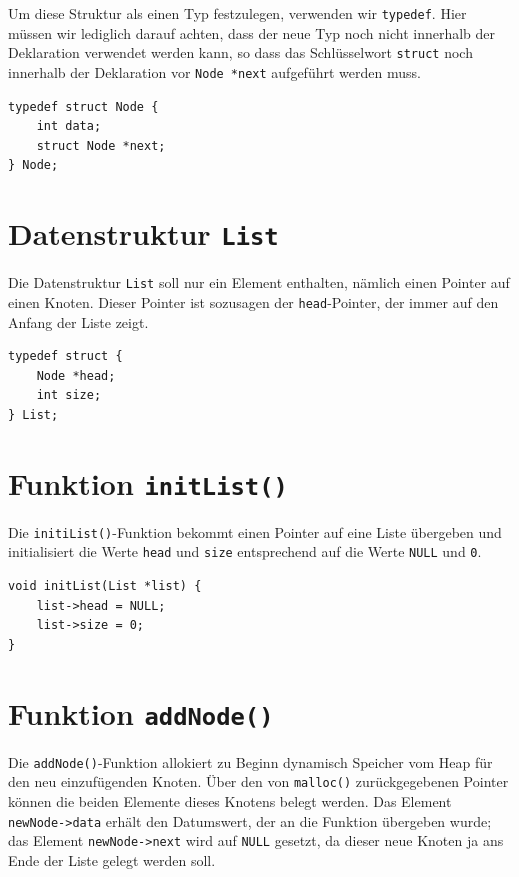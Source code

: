 Um diese Struktur als einen Typ festzulegen, verwenden wir
\texttt{typedef}. Hier müssen wir lediglich darauf achten, dass der neue
Typ noch nicht innerhalb der Deklaration verwendet werden kann, so dass das
Schlüsselwort \texttt{struct} noch innerhalb der Deklaration vor
\texttt{Node *next} aufgeführt werden muss.

\begin{verbatim}
typedef struct Node {
    int data;
    struct Node *next;
} Node;
\end{verbatim}

\section*{Datenstruktur \texttt{List}}

Die Datenstruktur \texttt{List} soll nur ein Element enthalten, nämlich
einen Pointer auf einen Knoten. Dieser Pointer ist sozusagen der
\texttt{head}-Pointer, der immer auf den Anfang der Liste zeigt.

\begin{verbatim}
typedef struct {
    Node *head;
    int size;
} List;
\end{verbatim}

\section*{Funktion \texttt{initList()}}

Die \texttt{initiList()}-Funktion bekommt einen Pointer auf eine Liste
übergeben und initialisiert die Werte \texttt{head} und
\texttt{size} entsprechend auf die Werte \texttt{NULL} und
\texttt{0}.

\begin{verbatim}
void initList(List *list) {
    list->head = NULL;
    list->size = 0;
}
\end{verbatim}

\section*{Funktion \texttt{addNode()}}

Die \texttt{addNode()}-Funktion allokiert zu Beginn dynamisch Speicher
vom Heap für den neu einzufügenden Knoten. Über den von \texttt{malloc()}
zurückgegebenen Pointer können die beiden Elemente dieses Knotens belegt werden.
Das Element \texttt{newNode->data} erhält den Datumswert, der an die
Funktion übergeben wurde; das Element \texttt{newNode->next} wird auf
\texttt{NULL} gesetzt, da dieser neue Knoten ja ans Ende der Liste gelegt
werden soll.

